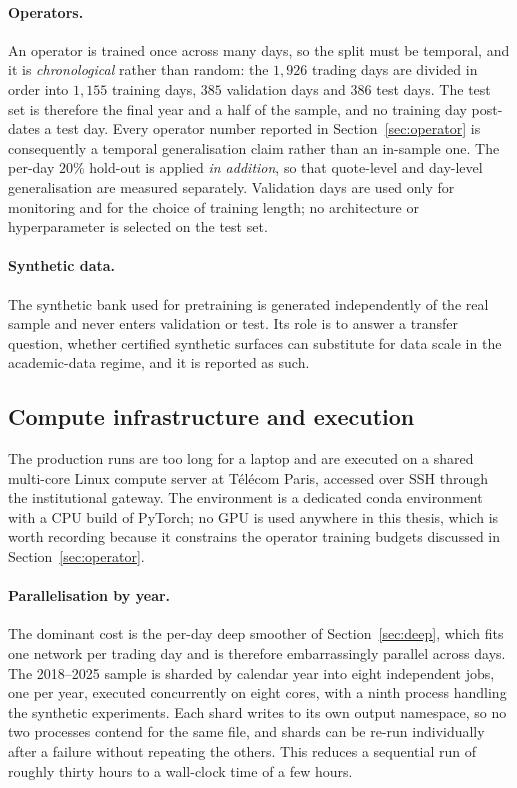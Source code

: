 \paragraph{Operators.} An operator is trained once across many days, so the split must be
temporal, and it is \emph{chronological} rather than random: the $1{,}926$ trading days are
divided in order into $1{,}155$ training days, $385$ validation days and $386$ test days. The
test set is therefore the final year and a half of the sample, and no training day post-dates a
test day. Every operator number reported in Section~\ref{sec:operator} is consequently a
temporal generalisation claim rather than an in-sample one. The per-day $20\%$ hold-out is
applied \emph{in addition}, so that quote-level and day-level generalisation are measured
separately. Validation days are used only for monitoring and for the choice of training length;
no architecture or hyperparameter is selected on the test set.

\paragraph{Synthetic data.} The synthetic bank used for pretraining is generated independently
of the real sample and never enters validation or test. Its role is to answer a transfer
question, whether certified synthetic surfaces can substitute for data scale in the
academic-data regime, and it is reported as such.

\subsection{Compute infrastructure and execution}\label{sec:compute}

The production runs are too long for a laptop and are executed on a shared multi-core Linux
compute server at T\'el\'ecom Paris, accessed over SSH through the institutional gateway. The
environment is a dedicated conda environment with a CPU build of PyTorch; no GPU is used
anywhere in this thesis, which is worth recording because it constrains the operator training
budgets discussed in Section~\ref{sec:operator}.

\paragraph{Parallelisation by year.} The dominant cost is the per-day deep smoother of
Section~\ref{sec:deep}, which fits one network per trading day and is therefore embarrassingly
parallel across days. The 2018--2025 sample is sharded by calendar year into eight independent
jobs, one per year, executed concurrently on eight cores, with a ninth process handling the
synthetic experiments. Each shard writes to its own output namespace, so no two processes
contend for the same file, and shards can be re-run individually after a failure without
repeating the others. This reduces a sequential run of roughly thirty hours to a wall-clock time
of a few hours.

